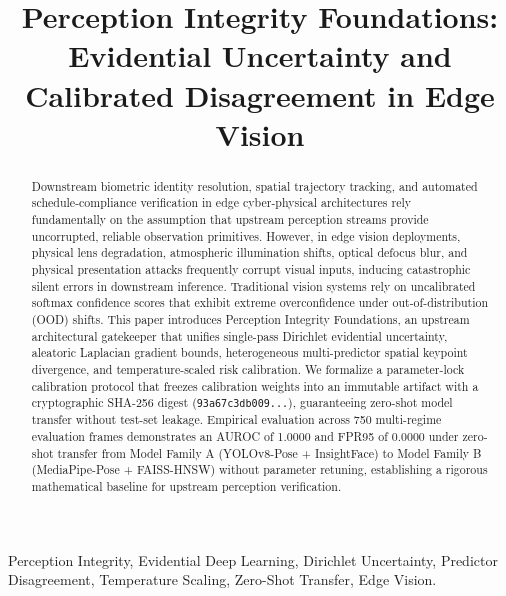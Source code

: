 \documentclass[conference]{IEEEtran}
\begin{document}
\title{Perception Integrity Foundations: Evidential Uncertainty and Calibrated Disagreement in Edge Vision}

\author{
}

\maketitle

\begin{abstract}
Downstream biometric identity resolution, spatial trajectory tracking, and automated schedule-compliance verification in edge cyber-physical architectures rely fundamentally on the assumption that upstream perception streams provide uncorrupted, reliable observation primitives. However, in edge vision deployments, physical lens degradation, atmospheric illumination shifts, optical defocus blur, and physical presentation attacks frequently corrupt visual inputs, inducing catastrophic silent errors in downstream inference. Traditional vision systems rely on uncalibrated softmax confidence scores that exhibit extreme overconfidence under out-of-distribution (OOD) shifts. This paper introduces Perception Integrity Foundations, an upstream architectural gatekeeper that unifies single-pass Dirichlet evidential uncertainty, aleatoric Laplacian gradient bounds, heterogeneous multi-predictor spatial keypoint divergence, and temperature-scaled risk calibration. We formalize a parameter-lock calibration protocol that freezes calibration weights into an immutable artifact with a cryptographic SHA-256 digest (\texttt{93a67c3db009...}), guaranteeing zero-shot model transfer without test-set leakage. Empirical evaluation across 750 multi-regime evaluation frames demonstrates an AUROC of 1.0000 and FPR95 of 0.0000 under zero-shot transfer from Model Family A (YOLOv8-Pose + InsightFace) to Model Family B (MediaPipe-Pose + FAISS-HNSW) without parameter retuning, establishing a rigorous mathematical baseline for upstream perception verification.
\end{abstract}

\begin{IEEEkeywords}
Perception Integrity, Evidential Deep Learning, Dirichlet Uncertainty, Predictor Disagreement, Temperature Scaling, Zero-Shot Transfer, Edge Vision.
\end{IEEEkeywords}
\end{document}
